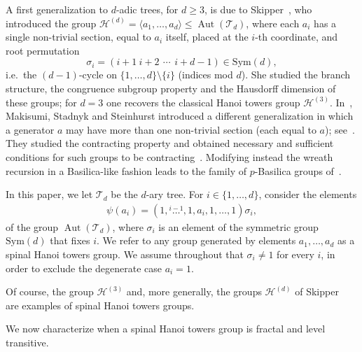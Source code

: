 \documentclass[11pt,leqno]{amsart}
\theoremstyle{plain}
\newcommand\T{{\mathcal{T}}}
\DeclareMathOperator{\Aut}{Aut}
\newcommand{\Sym}{\mathrm{Sym}}
\numberwithin{equation}{section}
\begin{document}
A first generalization to $d$-adic trees, for $d\geq 3$, is due to Skipper~\cite{Rachel}, who introduced the group $\mathcal{H}^{(d)}=\langle a_1,\dots,a_d\rangle\leq \Aut(\T_d)$, where each $a_i$ has a single non-trivial section, equal to $a_i$ itself, placed at the $i$-th coordinate, and root permutation
\[
\sigma_i=(i+1\   i+2\ \, \cdots\ \, i+d-1)\in \Sym(d),
\]
i.e.\ the $(d-1)$-cycle on $\{1,\dots,d\}\setminus\{i\}$ (indices mod $d$). She studied the branch structure, the congruence subgroup property and the Hausdorff dimension of these groups; for $d=3$ one recovers the classical Hanoi towers group $\mathcal{H}^{(3)}$. In~\cite{modified}, Makisumi, Stadnyk and Steinhurst introduced a different generalization in which a generator $a$ may have more than one non-trivial section (each equal to $a$); see~\cite[Definition~4.1]{modified}. They studied the contracting property and obtained necessary and sufficient conditions for such groups to be contracting~\cite[Proposition~4.4, Theorem~4.5]{modified}. Modifying instead the wreath recursion in a Basilica-like fashion leads to the family of $p$-Basilica groups of~\cite{p-Basilica}.


In this paper, we let $\T_d$ be the $d$-ary tree. For $i\in \{1,\dots, d\}$, consider the elements
\begin{align*}
\psi(a_i)=(1,\stackrel{i-1}{\dots},1,a_i,1,\dots, 1)\sigma_i,
\end{align*}
of the group $\Aut (\T_d)$,  where $\sigma_i$ is an element of the symmetric group $\Sym(d)$ that fixes $i$. We refer to any group generated by elements $a_1,\dots, a_d$ as a spinal Hanoi towers group. 
We assume throughout that $\sigma_{i}\neq 1$ for every $i$, in order to exclude the degenerate case $a_{i}=1$.

Of course, the group $\mathcal{H}^{(3)}$ and, more generally, the groups $\mathcal{H}^{(d)}$ of Skipper~\cite{Rachel} are examples of spinal Hanoi towers groups.



We now characterize when a spinal Hanoi towers group is fractal and level transitive.
\end{document}
